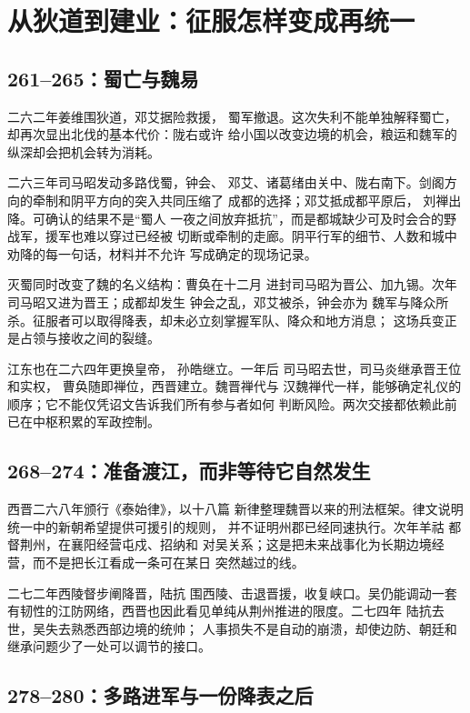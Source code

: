 \section{从狄道到建业：征服怎样变成再统一}

\subsection{261--265：蜀亡与魏易}

二六二年姜维围狄道，邓艾据险救援，
蜀军撤退。这次失利不能单独解释蜀亡，却再次显出北伐的基本代价：陇右或许
给小国以改变边境的机会，粮运和魏军的纵深却会把机会转为消耗。

二六三年司马昭发动多路伐蜀，钟会、
邓艾、诸葛绪由关中、陇右南下。剑阁方向的牵制和阴平方向的突入共同压缩了
成都的选择；邓艾抵成都平原后，
刘禅出降。可确认的结果不是“蜀人
一夜之间放弃抵抗”，而是都城缺少可及时会合的野战军，援军也难以穿过已经被
切断或牵制的走廊。阴平行军的细节、人数和城中劝降的每一句话，材料并不允许
写成确定的现场记录。

灭蜀同时改变了魏的名义结构：曹奂在十二月
进封司马昭为晋公、加九锡。次年
司马昭又进为晋王；成都却发生
钟会之乱，邓艾被杀，钟会亦为
魏军与降众所杀。征服者可以取得降表，却未必立刻掌握军队、降众和地方消息；
这场兵变正是占领与接收之间的裂缝。

江东也在二六四年更换皇帝，
孙皓继立。一年后
司马昭去世，司马炎继承晋王位和实权，
曹奂随即禅位，西晋建立。魏晋禅代与
汉魏禅代一样，能够确定礼仪的顺序；它不能仅凭诏文告诉我们所有参与者如何
判断风险。两次交接都依赖此前已在中枢积累的军政控制。

\subsection{268--274：准备渡江，而非等待它自然发生}

西晋二六八年颁行《泰始律》，以十八篇
新律整理魏晋以来的刑法框架。律文说明统一中的新朝希望提供可援引的规则，
并不证明州郡已经同速执行。次年羊祜
都督荆州，在襄阳经营屯戍、招纳和
对吴关系；这是把未来战事化为长期边境经营，而不是把长江看成一条可在某日
突然越过的线。

二七二年西陵督步阐降晋，陆抗
围西陵、击退晋援，收复峡口。吴仍能调动一套
有韧性的江防网络，西晋也因此看见单纯从荆州推进的限度。二七四年
陆抗去世，吴失去熟悉西部边境的统帅；
人事损失不是自动的崩溃，却使边防、朝廷和继承问题少了一处可以调节的接口。

\subsection{278--280：多路进军与一份降表之后}

